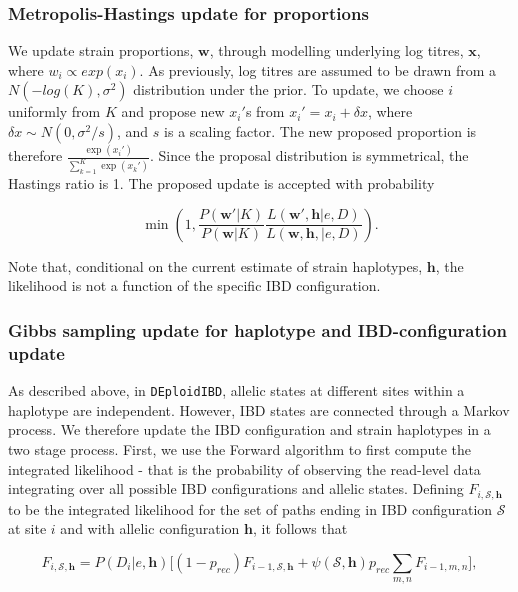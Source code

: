 \documentclass[9pt,lineno]{elife}
\begin{document}
\begin{appendixbox}
\subsubsection{Metropolis-Hastings update for proportions}\label{sec:updateP}

We update strain proportions, $\mathbf{w}$, through modelling underlying log titres, $\mathbf{x}$, where $w_i \propto exp(x_i)$.  As previously, log titres are assumed to be drawn from a $N(-log(K), \sigma^2)$ distribution under the prior. To update, we choose $i$ uniformly from $K$ and propose new $x_i'$s from $x_i' = x_i + \delta x$, where $\delta x \sim N(0, \sigma^2/s)$, and $s$ is a scaling factor. The new proposed proportion is therefore $\frac{\exp(x_i')}{\sum_{k=1}^K \exp(x_k')}$. Since the proposal distribution is symmetrical, the Hastings ratio is 1. The proposed update is accepted with probability

 $$\min\left(1, \frac{P(\mathbf{w}'|K)}{P(\mathbf{w}|K)} \frac{L(\mathbf{w}', \mathbf{h} | e, D)}{L(\mathbf{w}, \mathbf{h},  | e, D)}\right).$$

\noindent Note that, conditional on the current estimate of strain haplotypes, $\mathbf{h}$, the likelihood is not a function of the specific IBD configuration.


\subsubsection{Gibbs sampling update for haplotype and IBD-configuration update}

As described above, in {\tt DEploidIBD}, allelic states at different sites within a haplotype are independent. However, IBD states are connected through a Markov process. We therefore update the IBD configuration and strain haplotypes in a two stage process.  First, we use the Forward algorithm to first compute the integrated likelihood - that is the probability of observing the read-level data integrating over all possible IBD configurations and allelic states.  Defining $F_{i,\mathcal{S},\mathbf{h}}$ to be the integrated likelihood for the set of paths ending in IBD configuration $\mathcal{S}$ at site $i$ and with allelic configuration $\mathbf{h}$, it follows that

\begin{equation}
    F_{i,\mathcal{S},\mathbf{h}} = P(D_{i}|e,\mathbf{h}) \big[(1-p_{rec}) F_{i-1,\mathcal{S},\mathbf{h}} +  \psi(\mathcal{S},\mathbf{h}) p_{rec} \sum_{m,n}F_{i-1,m,n}\big],
\end{equation}


\end{appendixbox}
\end{document}
